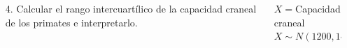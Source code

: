 \documentclass[aspectratio=169,10pt,t]{beamer}
\begin{document}
\begin{frame}
\begin{columns}
\begin{column}[T]{0.7\textwidth}
\begin{enumerate}
\item[4.] Calcular el rango intercuartílico de la capacidad craneal de los primates e interpretarlo.
\end{enumerate}
\end{column}
\begin{column}[T]{0.3\textwidth}
\begin{datos}
$X=$Capacidad craneal\\
$X\sim N(1200, 140)$
\end{datos}
\end{column}
\end{columns}
\end{frame}     
\end{document}
